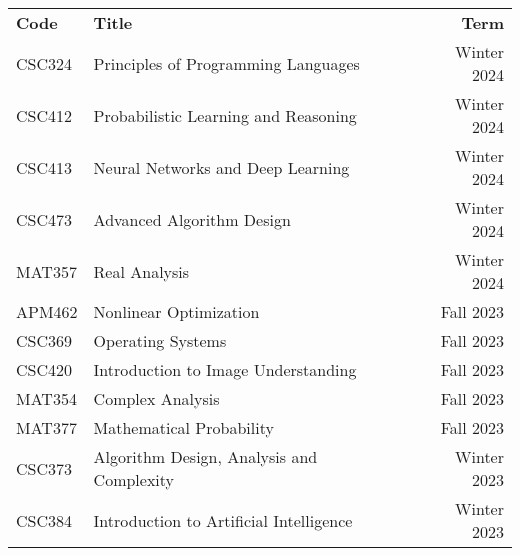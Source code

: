 \documentclass[letterpaper,11pt]{article}
\newcommand{\rom}[1]{\uppercase\expandafter{\romannumeral #1\relax}}
\begin{document}
\begin{minipage}{\textwidth}

      \begin{tabularx}{0.98\textwidth}{ p{6.0em} X r }
        \textbf{Code} & \textbf{Title} & \textbf{Term} \\
        \noalign{\vspace{0.1em}}
        \hline\hline
        \noalign{\vspace{0.2em}}
        CSC324 & Principles of Programming Languages & Winter 2024 \\
        CSC412\footnotemark[2] & Probabilistic Learning and Reasoning & Winter 2024 \\
        CSC413\footnotemark[2] & Neural Networks and Deep Learning & Winter 2024 \\
        CSC473 & Advanced Algorithm Design & Winter 2024 \\
        MAT357 & Real Analysis \rom{1} & Winter 2024 \\


        APM462 & Nonlinear Optimization & Fall 2023 \\
        CSC369 & Operating Systems & Fall 2023 \\
        CSC420 & Introduction to Image Understanding & Fall 2023 \\
        MAT354 & Complex Analysis \rom{1} & Fall 2023 \\
        MAT377 & Mathematical Probability & Fall 2023 \\


        CSC373 & Algorithm Design, Analysis and Complexity & Winter 2023 \\
        CSC384 & Introduction to Artificial Intelligence & Winter 2023 \\


\end{tabularx}
\end{minipage}
\end{document}
